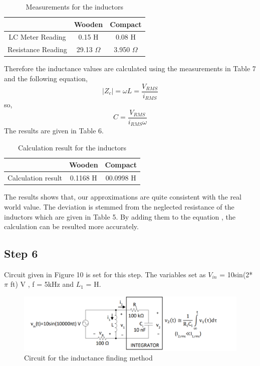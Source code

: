 \documentclass[letterpaper,12pt]{article}
\begin{document}
\begin{table}[H]
	\begin{center}
		\caption{Measurements for the inductors}
		\vspace{2mm}
		\begin{tabular}{||c | c | c||} 
		 \hline
		   & Wooden & Compact \\ [0.5ex] 
		 \hline\hline
		LC Meter Reading & 0.15 H & 0.08 H \\
		 \hline
		Resistance Reading & 29.13 \(\Omega\) & 3.950 \(\Omega\) \\
		 \hline
		\end{tabular}
\end{center}
\end{table}
Therefore the inductance values are calculated using the measurements in Table 7 and the following equation,
\[|Z_c| = \omega L = \frac{V_{RMS}}{i_{RMS}}\]
so,
\[C = \frac{V_{RMS} }{i_{RMS} \omega}
	\]
The results are given in Table 6.
\begin{table}[H]
	\begin{center}
		\caption{Calculation result for the inductors}
		\vspace{2mm}
		\begin{tabular}{||c | c | c||} 
		 \hline
		   & Wooden & Compact \\ [0.5ex] 
		 \hline\hline
		Calculation result & 0.1168 H & 00.0998 H \\
		 \hline
		\end{tabular}
\end{center}
\end{table}
The results shows that, our approximations are quite consistent with the real world value. The deviation is stemmed from the neglected resistance of the inductors which are given in Table 5. By adding them to the equation , the calculation can be resulted more accurately.
\subsection{Step 6}
Circuit given in Figure 10 is set for this step. The variables set as \(V_{in}\) = 10sin(2*\(\pi\) ft) V , f = 5kHz and \(L_1\) = H.
\begin{figure}[H]
	\centering
   \includegraphics[width=1\textwidth]{PRE7.png}
   \caption{Circuit for the inductance finding method}
\end{figure}
\end{document}
